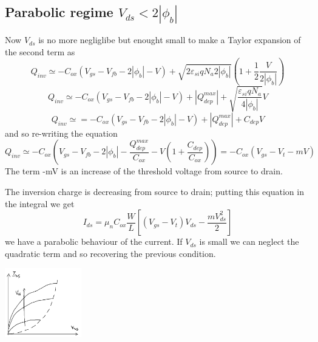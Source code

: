 \subsection{Parabolic regime $V_{ds}<2|\phi_b|$}
Now $V_{ds}$ is no more negliglibe but enought small to make a Taylor expansion of the second term as
\begin{equation}
Q_{inv}\simeq -C_{ox}(V_{gs}-V_{fb}-2|\phi_b|-V)+\sqrt{2\varepsilon_{si}qN_a2|\phi_b|}(1+\frac{1}{2}\frac{V}{2|\phi_b|})
\end{equation}
\begin{equation}
Q_{inv}\simeq -C_{ox}(V_{gs}-V_{fb}-2|\phi_b|-V)+|Q_{dep}^{max}|+\sqrt{\frac{\varepsilon_{si}qN_a}{4|\phi_b|}}V
\end{equation}
\begin{equation}
Q_{inv}\simeq=-C_{ox}(V_{gs}-V_{fb}-2|\phi_b|-V)+|Q_{dep}^{max}|+C_{dep}V
\end{equation}
and so re-writing the equation
\begin{equation}
Q_{inv}\simeq-C_{ox}(V_{gs}-V_{fb}-2|\phi_b|-\frac{Q_{dep}^{max}}{C_{ox}}-V(1+\frac{C_{dep}}{C_{ox}}))=-C_{ox}(V_{gs}-V_t-mV)
\end{equation}
The term -mV is an increase of the threshold voltage from source to drain.\\

\vspace{3mm}
\centering
{}
\raggedright
\vspace{3mm}


The inversion charge is decreasing from source to drain; putting this equation in the integral we get 
\begin{equation}
I_{ds}=\mu_nC_{ox}\frac{W}{L}[(V_{gs}-V_t)V_{ds}-\frac{mV_{ds}^2}{2}]
\end{equation}
we have a parabolic behaviour of the current. If $V_{ds}$ is small we can neglect the quadratic term and so recovering the previous condition.


\centering
\includegraphics[width=0.25\textwidth]{parabreg.png}\\
\raggedright


